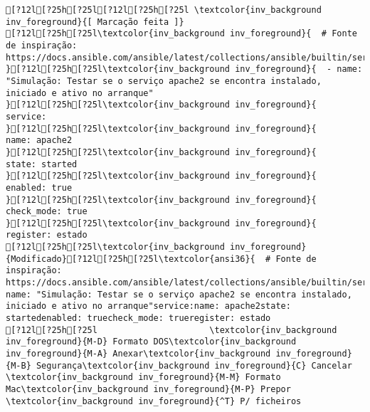 \documentclass{scrartcl}
\begin{document}
\begin{Verbatim}
[?12l[?25h[?25l[?12l[?25h[?25l \textcolor{inv_background inv_foreground}{[ Marcação feita ]}
[?12l[?25h[?25l\textcolor{inv_background inv_foreground}{  # Fonte de inspiração: https://docs.ansible.com/ansible/latest/collections/ansible/builtin/service_module.html
}[?12l[?25h[?25l\textcolor{inv_background inv_foreground}{  - name: "Simulação: Testar se o serviço apache2 se encontra instalado, iniciado e ativo no arranque"
}[?12l[?25h[?25l\textcolor{inv_background inv_foreground}{    service:
}[?12l[?25h[?25l\textcolor{inv_background inv_foreground}{      name: apache2
}[?12l[?25h[?25l\textcolor{inv_background inv_foreground}{      state: started
}[?12l[?25h[?25l\textcolor{inv_background inv_foreground}{      enabled: true
}[?12l[?25h[?25l\textcolor{inv_background inv_foreground}{    check_mode: true
}[?12l[?25h[?25l\textcolor{inv_background inv_foreground}{    register: estado
[?12l[?25h[?25l\textcolor{inv_background inv_foreground}{Modificado}[?12l[?25h[?25l\textcolor{ansi36}{  # Fonte de inspiração: https://docs.ansible.com/ansible/latest/collections/ansible/builtin/service_module.html}- name: "Simulação: Testar se o serviço apache2 se encontra instalado, iniciado e ativo no arranque"service:name: apache2state: startedenabled: truecheck_mode: trueregister: estado
[?12l[?25h[?25l                      \textcolor{inv_background inv_foreground}{M-D} Formato DOS\textcolor{inv_background inv_foreground}{M-A} Anexar\textcolor{inv_background inv_foreground}{M-B} Segurança\textcolor{inv_background inv_foreground}{C} Cancelar                        \textcolor{inv_background inv_foreground}{M-M} Formato Mac\textcolor{inv_background inv_foreground}{M-P} Prepor         \textcolor{inv_background inv_foreground}{^T} P/ ficheiros

\end{Verbatim}
\end{document}
